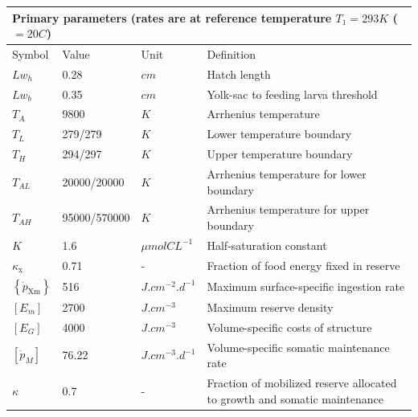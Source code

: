 \begin{table}[H]
\centering
{}
\begin{adjustbox}{width=1.2\textwidth}
\begin{tabular}{l|l|l|l}
\toprule
\multicolumn{4}{l}{
	Primary parameters (rates are at reference temperature $T_{1} = 293 K$  ($=20$\textdegree $C$)} \\
\midrule
Symbol		& 
Value		& 
Unit		&
Definition	\\
\midrule
$Lw_{h}$		& 
0.28			& 
$cm$			& 
Hatch length	\\
$Lw_{b}$									& 
0.35									& 
$cm$									& 
Yolk-sac to feeding larva threshold		\\
$T_{A}$					& 
9800					& 
$K$						& 
Arrhenius temperature	\\
$T_{L}$						& 
279/279						& 
$K$							& 
Lower temperature boundary	\\
$T_{H}$							& 
294/297							& 
$K$								& 
Upper temperature boundary		\\
$T_{AL}$									& 
20000/20000									& 
$K$											& 
Arrhenius temperature for lower boundary	\\
$T_{AH}$										& 
95000/570000									& 
$K$												& 
Arrhenius temperature for upper boundary		\\
$K$							& 
1.6							& 
$\mu mol CL^{-1}$			& 
Half-saturation constant	\\
$\kappa_{\mathrm{x}}$						& 
0.71										& 
-											& 
Fraction of food energy fixed in reserve	\\
$\left\{\dot{p}_\mathrm{Xm} \right\}$			& 
516												& 
$J.cm^{-2}.d^{-1}$								& 
Maximum surface-specific ingestion rate		\\
$\left[E_{m} \right]$		& 
2700						& 
$J.cm^{-3}$					& 
Maximum reserve density		\\
$\left[E_{G} \right]$				& 
4000								& 
$J.cm^{-3}$							& 
Volume-specific costs of structure	\\
$\left[\dot{p}_{M} \right]$					& 
76.22										& 
$J.cm^{-3}.d^{-1}$							& 
Volume-specific somatic maintenance rate	\\
$\kappa$																	& 
0.7																			& 
-																			& 
Fraction of mobilized reserve allocated to growth and somatic maintenance	\\
\bottomrule
\end{tabular}
\end{adjustbox}
\end{table}

